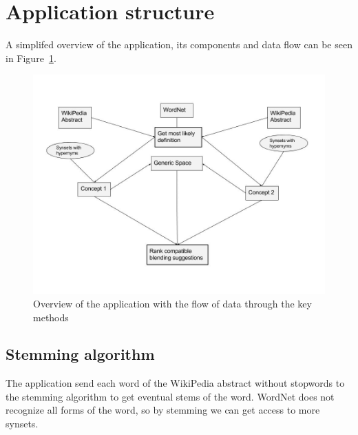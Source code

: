 


\section{Application structure}
A simplifed overview of the application, its components and data flow can be seen in Figure~\ref{fig:application-structure}.

\begin{figure}
\centering
\includegraphics[width=1\linewidth]{"Figures/Application structure"}
\caption{Overview of the application with the flow of data through the key methods}
\label{fig:application-structure}
\end{figure}

\subsection{Stemming algorithm}
The application send each word of the WikiPedia abstract without stopwords to the stemming algorithm to get eventual stems of the word. WordNet does not recognize all forms of the word, so by stemming we can get access to more synsets.

